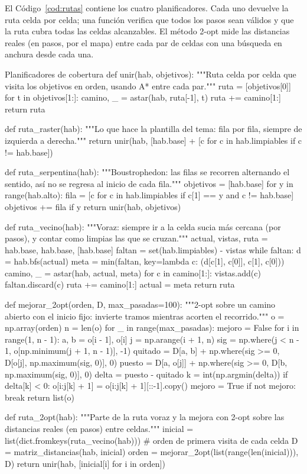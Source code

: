 \documentclass[11pt,letterpaper]{article}
\begin{document}
El Código~\ref{cod:rutas} contiene los cuatro planificadores. Cada uno devuelve la ruta celda por celda; una función verifica que todos los pasos sean válidos y que la ruta cubra todas las celdas alcanzables. El método 2-opt mide las distancias reales (en pasos, por el mapa) entre cada par de celdas con una búsqueda en anchura desde cada una.

\begin{codigo}[label=cod:rutas]{Planificadores de cobertura}
def unir(hab, objetivos):
    """Ruta celda por celda que visita los objetivos en orden, usando A* entre cada par."""
    ruta = [objetivos[0]]
    for t in objetivos[1:]:
        camino, _ = astar(hab, ruta[-1], t)
        ruta += camino[1:]
    return ruta


def ruta_raster(hab):
    """Lo que hace la plantilla del tema: fila por fila, siempre de izquierda a derecha."""
    return unir(hab, [hab.base] + [c for c in hab.limpiables if c != hab.base])


def ruta_serpentina(hab):
    """Boustrophedon: las filas se recorren alternando el sentido, así no se regresa al inicio de cada fila."""
    objetivos = [hab.base]
    for y in range(hab.alto):
        fila = [c for c in hab.limpiables if c[1] == y and c != hab.base]
        objetivos += fila if y %
    return unir(hab, objetivos)


def ruta_vecino(hab):
    """Voraz: siempre ir a la celda sucia más cercana (por pasos), y contar como limpias las que se cruzan."""
    actual, vistas, ruta = hab.base, {hab.base}, [hab.base]
    faltan = set(hab.limpiables) - vistas
    while faltan:
        d = hab.bfs(actual)
        meta = min(faltan, key=lambda c: (d[c[1], c[0]], c[1], c[0]))
        camino, _ = astar(hab, actual, meta)
        for c in camino[1:]:
            vistas.add(c)
            faltan.discard(c)
        ruta += camino[1:]
        actual = meta
    return ruta


def mejorar_2opt(orden, D, max_pasadas=100):
    """2-opt sobre un camino abierto con el inicio fijo: invierte tramos mientras acorten el recorrido."""
    o = np.array(orden)
    n = len(o)
    for _ in range(max_pasadas):
        mejoro = False
        for i in range(1, n - 1):
            a, b = o[i - 1], o[i]
            j = np.arange(i + 1, n)
            sig = np.where(j < n - 1, o[np.minimum(j + 1, n - 1)], -1)
            quitado = D[a, b] + np.where(sig >= 0, D[o[j], np.maximum(sig, 0)], 0)
            puesto = D[a, o[j]] + np.where(sig >= 0, D[b, np.maximum(sig, 0)], 0)
            delta = puesto - quitado
            k = int(np.argmin(delta))
            if delta[k] < 0:
                o[i:j[k] + 1] = o[i:j[k] + 1][::-1].copy()
                mejoro = True
        if not mejoro:
            break
    return list(o)


def ruta_2opt(hab):
    """Parte de la ruta voraz y la mejora con 2-opt sobre las distancias reales (en pasos) entre celdas."""
    inicial = list(dict.fromkeys(ruta_vecino(hab)))          # orden de primera visita de cada celda
    D = matriz_distancias(hab, inicial)
    orden = mejorar_2opt(list(range(len(inicial))), D)
    return unir(hab, [inicial[i] for i in orden])
\end{codigo}
\end{document}
